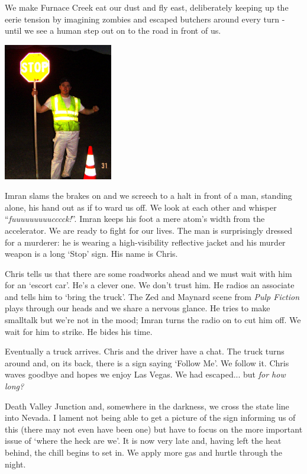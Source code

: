 \documentclass[a5paper,titlepage,11pt]{book}
\begin{document}
We make Furnace Creek eat our dust and fly east, deliberately keeping up the eerie tension by imagining zombies and escaped butchers around every turn - until we see a human step out on to the road in front of us.

\begin{center}\includegraphics[height=60mm]{gfx/DSC00683}\end{center}

Imran slams the brakes on and we screech to a halt in front of a man, standing alone, his hand out as if to ward us off.  We look at each other and whisper ``\emph{fuuuuuuuuucccck!}''.  Imran keeps his foot a mere atom's width from the accelerator.  We are ready to fight for our lives.  The man is surprisingly dressed for a murderer: he is wearing a high-visibility reflective jacket and his murder weapon is a long `Stop' sign.  His name is Chris.

Chris tells us that there are some roadworks ahead and we must wait with him for an `escort car'.  He's a clever one.  We don't trust him.  He radios an associate and tells him to `bring the truck'.  The Zed and Maynard scene from \emph{Pulp Fiction} plays through our heads and we share a nervous glance.  He tries to make smalltalk but we're not in the mood; Imran turns the radio on to cut him off.  We wait for him to strike.  He bides his time.

Eventually a truck arrives.  Chris and the driver have a chat.  The truck turns around and, on its back, there is a sign saying `Follow Me'.  We follow it.  Chris waves goodbye and hopes we enjoy Las Vegas.  We had escaped... but \emph{for how long?}

Death Valley Junction and, somewhere in the darkness, we cross the state line into Nevada.  I lament not being able to get a picture of the sign informing us of this (there may not even have been one) but have to focus on the more important issue of `where the heck are we'.  It is now very late and, having left the heat behind, the chill begins to set in.  We apply more gas and hurtle through the night.
\end{document}
